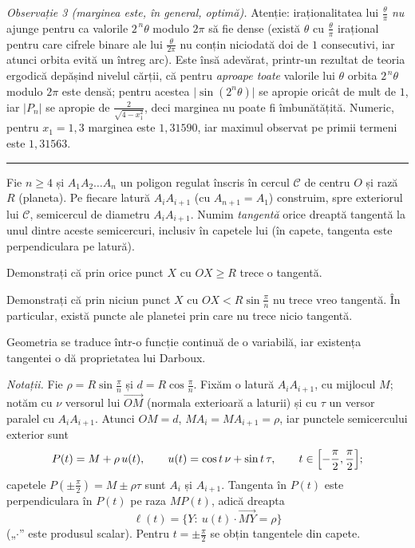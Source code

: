 \emph{Observație 3 (marginea este, în general, optimă).} Atenție: iraționalitatea lui $\frac{\theta}{\pi}$ \emph{nu} ajunge pentru ca valorile $2^{\,n}\theta$ modulo $2\pi$ să fie dense (există $\theta$ cu $\frac\theta\pi$ irațional pentru care cifrele binare ale lui $\frac{\theta}{2\pi}$ nu conțin niciodată doi de $1$ consecutivi, iar atunci orbita evită un întreg arc). Este însă adevărat, printr-un rezultat de teoria ergodică depășind nivelul cărții, că pentru \emph{aproape toate} valorile lui $\theta$ orbita $2^{\,n}\theta$ modulo $2\pi$ este densă; pentru acestea $\bigl|\sin(2^{n}\theta)\bigr|$ se apropie oricât de mult de $1$, iar $|P_{n}|$ se apropie de $\frac{2}{\sqrt{4-x_{1}^{2}}}$, deci marginea nu poate fi îmbunătățită. Numeric, pentru $x_{1}=1{,}3$ marginea este $1{,}31590$, iar maximul observat pe primii termeni este $1{,}31563$.
\vspace{1mm}\hrule

Fie $n\ge4$ și $A_1A_2\ldots A_n$ un poligon regulat înscris în cercul $\mathcal C$ de centru $O$ și rază $R$ (planeta). Pe fiecare latură $A_iA_{i+1}$ (cu $A_{n+1}=A_1$) construim, spre exteriorul lui $\mathcal C$, semicercul de diametru $A_iA_{i+1}$. Numim \emph{tangentă} orice dreaptă tangentă la unul dintre aceste semicercuri, inclusiv în capetele lui (în capete, tangenta este perpendiculara pe latură).
\begin{parti}
  \item Demonstrați că prin orice punct $X$ cu $OX\ge R$ trece o tangentă.
  \item Demonstrați că prin niciun punct $X$ cu $OX<R\sin\frac{\pi}{n}$ nu trece vreo tangentă. În particular, există puncte ale planetei prin care nu trece nicio tangentă.
\end{parti}
\figpetaleext
\sol Geometria se traduce într-o funcție continuă de o variabilă, iar existența tangentei o dă proprietatea lui Darboux.

\emph{Notații.} Fie $\rho=R\sin\frac{\pi}{n}$ și $d=R\cos\frac{\pi}{n}$. Fixăm o latură $A_iA_{i+1}$, cu mijlocul $M$; notăm cu $\nu$ versorul lui $\overrightarrow{OM}$ (normala exterioară a laturii) și cu $\tau$ un versor paralel cu $A_iA_{i+1}$. Atunci $OM=d$, $MA_i=MA_{i+1}=\rho$, iar punctele semicercului exterior sunt
\[ P(t)=M+\rho\,u(t),\qquad u(t)=\cos t\,\nu+\sin t\,\tau,\qquad t\in\Bigl[-\frac\pi2,\frac\pi2\Bigr] ; \]
capetele $P(\pm\frac\pi2)=M\pm\rho\tau$ sunt $A_i$ și $A_{i+1}$. Tangenta în $P(t)$ este perpendiculara în $P(t)$ pe raza $MP(t)$, adică dreapta
\[ \ell(t)=\bigl\{Y:\ u(t)\cdot\overrightarrow{MY}=\rho\bigr\} \]
(„$\cdot$'' este produsul scalar). Pentru $t=\pm\frac\pi2$ se obțin tangentele din capete.


